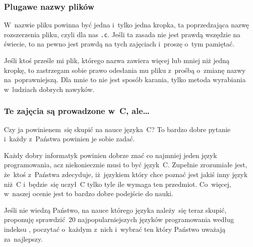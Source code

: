 \documentclass[10pt,t]{beamer}
\begin{document}
\begin{frame}
  \frametitle{Plugawe nazwy plików}


  W~nazwie pliku powinna być \alert{jedna i~tylko jedna kropka}, ta
  poprzedzająca nazwę rozszerzenia pliku, czyli dla nas \texttt{.c}.
  Jeśli ta zasada nie jest prawdą wszędzie na świecie, to na pewno jest
  prawdą na tych zajęciach i~proszę o~tym pamiętać.

  Jeśli ktoś prześle mi plik, którego nazwa zawiera więcej lub mniej niż
  \alert{jedną} kropkę, to zastrzegam sobie prawo odesłania mu pliku
  z~prośbą o~zmianę nazwy na~poprawniejszą. Dla mnie to nie jest sposób
  karania, tylko metoda wyrabiania w~ludziach dobrych nawyków.

\end{frame}





\begin{frame}
  \frametitle{Te zajęcia są prowadzone w~C, ale\ldots}


  Czy ja powinienem~się skupić na nauce języka~C? To bardzo dobre
  pytanie i~każdy z~Państwa powinien je sobie zadać.

  Każdy dobry informatyk powinien dobrze znać co najmniej jeden język
  programowania, acz niekoniecznie musi to być język~C. Zupełnie zrozumiałe
  jest, że~ktoś z~Państwa zdecyduje, iż~językiem który chce poznać jest
  jakiś inny język niż~C i~będzie~się uczył~C tylko tyle ile wymaga ten
  przedmiot. Co~więcej, w~naszej ocenie jest to bardzo dobre podejście do
  nauki.

  Jeśli nie wiedzą Państwo, na nauce którego języka należy~się teraz skupić,
  proponuję sprawdzić~$20$ najpopularniejszych języków programowania
  według indeksu
  ,
  poczytać o~każdym z~nich i~wybrać ten który Państwo uważają za~najlepszy.

\end{frame}
\end{document}

